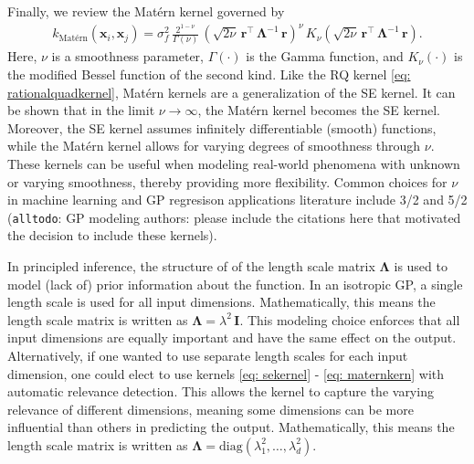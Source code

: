 \documentclass[journal=jacsat,manuscript=article]{achemso}
\newcommand{\alltodo}[1]{{\color{Cyan} (\texttt{alltodo}: #1)}}
\newcommand{\xvec}{\ensuremath{\mathbf{x}}}
\begin{document}
Finally, we review the Mat\'ern kernel governed by
\begin{gather}
    k_{\text{Mat\'ern}}(\xvec_i,\xvec_j) = \sigma_f^2 \,\frac{2^{1-\nu}}{\Gamma(\nu)} \, \left(\sqrt{2\nu} \, \mathbf{r}^\intercal \,\boldsymbol{\Lambda}^{-1} \,\mathbf{r} \right)^{\nu}\, K_\nu  \left(\sqrt{2\nu} \, \mathbf{r}^\intercal \,\boldsymbol{\Lambda}^{-1} \,\mathbf{r} \right). \label{eq: maternkern}
\end{gather}
Here, $\nu$ is a smoothness parameter, $\Gamma(\cdot)$ is the Gamma function, and $K_\nu(\cdot)$ is the modified Bessel function of the second kind. Like the RQ kernel \eqref{eq: rationalquadkernel}, Matérn kernels are a generalization of the SE kernel. It can be shown that in the limit $\nu \rightarrow \infty$, the Mat\'ern kernel becomes the SE kernel. Moreover, the SE kernel assumes infinitely differentiable (smooth) functions, while the Matérn kernel allows for varying degrees of smoothness through $\nu$. These kernels can be useful when modeling real-world phenomena with unknown or varying smoothness, thereby providing more flexibility. Common choices for $\nu$ in machine learning and GP regresison applications literature include 3/2 and 5/2 \alltodo{GP modeling authors: please include the citations here that motivated the decision to include these kernels}. 

In principled inference, the structure of of the length scale matrix $\boldsymbol{\Lambda}$ is used to model (lack of) prior information about the function. In an isotropic GP, a single length scale is used for all input dimensions. Mathematically, this means the length scale matrix is written as $\boldsymbol{\Lambda} = \lambda^2 \, \mathbf{I}$. This modeling choice enforces that all input dimensions are equally important and have the same effect on the output. Alternatively, if one wanted to use separate length scales for each input dimension, one could elect to use kernels \eqref{eq: sekernel} - \eqref{eq: maternkern} with automatic relevance detection. This allows the kernel to capture the varying relevance of different dimensions, meaning some dimensions can be more influential than others in predicting the output. Mathematically, this means the length scale matrix is written as $\boldsymbol{\Lambda} = \text{diag}(\lambda_1^2,\dots,\lambda_d^2)$.
\end{document}
